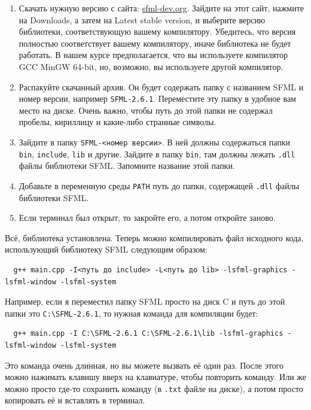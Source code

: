 \documentclass{article}
\begin{document}
\begin{enumerate}
\item Скачать нужную версию с сайта: \href{https://www.sfml-dev.org/}{sfml-dev.org}. Зайдите на этот сайт, нажмите на Downloads, а затем на Latest stable version, и выберите версию библиотеки, соответствующую вашему компилятору. Убедитесь, что версия полностью соответствует вашему компилятору, иначе библиотека не будет работать. В нашем курсе предполагается, что вы используете компилятор GCC MinGW 64-bit, но, возможно, вы используете другой компилятор.

\item Распакуйте скачанный архив. Он будет содержать папку с названием SFML и номер версии, например \texttt{SFML-2.6.1}. Переместите эту папку в удобное вам место на диске. Очень важно, чтобы путь до этой папки не содержал пробелы, кириллицу и какие-либо странные символы.

\item Зайдите в папку \texttt{SFML-<номер версии>}. В ней должны содержаться папки \texttt{bin}, \texttt{include}, \texttt{lib} и другие. Зайдите в папку \texttt{bin}, там должны лежать \texttt{.dll} файлы библиотеки SFML. Запомните название этой папки.

\item Добавьте в переменную среды \texttt{PATH} путь до папки, содержащей \texttt{.dll} файлы библиотеки SFML.

\item Если терминал был открыт, то закройте его, а потом откройте заново.
\end{enumerate}
Всё, библиотека установлена. Теперь можно компилировать файл исходного кода, использующий библиотеку SFML следующим образом:
\begin{verbatim}
  g++ main.cpp -I<путь до include> -L<путь до lib> -lsfml-graphics -lsfml-window -lsfml-system
\end{verbatim}
Например, если я переместил папку SFML просто на диск C и путь до этой папки это \texttt{C:\textbackslash SFML-2.6.1}, то нужная команда для компиляции будет:
\begin{verbatim}
  g++ main.cpp -I C:\SFML-2.6.1 C:\SFML-2.6.1\lib -lsfml-graphics -lsfml-window -lsfml-system
\end{verbatim}
Это команда очень длинная, но вы можете вызвать её один раз. После этого можно нажимать клавишу вверх на клавиатуре, чтобы повторить команду. Или же можно просто где-то сохранить команду (в \texttt{.txt} файле на диске), а потом просто копировать её и вставлять в терминал.
\end{document}
